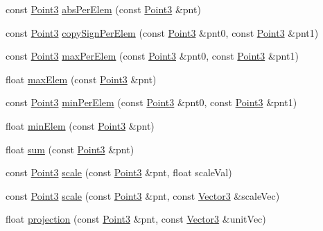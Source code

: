 \begin{DoxyCompactItemize}
\item 
const \hyperlink{classVectormath_1_1Aos_1_1Point3}{Point3} \hyperlink{namespaceVectormath_1_1Aos_a2dc9cb8fddee673606389e9eafd66e33}{abs\-Per\-Elem} (const \hyperlink{classVectormath_1_1Aos_1_1Point3}{Point3} \&pnt)
\item 
const \hyperlink{classVectormath_1_1Aos_1_1Point3}{Point3} \hyperlink{namespaceVectormath_1_1Aos_aa25654a3f5d357a4d5eec542447f8d8e}{copy\-Sign\-Per\-Elem} (const \hyperlink{classVectormath_1_1Aos_1_1Point3}{Point3} \&pnt0, const \hyperlink{classVectormath_1_1Aos_1_1Point3}{Point3} \&pnt1)
\item 
const \hyperlink{classVectormath_1_1Aos_1_1Point3}{Point3} \hyperlink{namespaceVectormath_1_1Aos_a9ca587f7de3b5a3c4bb8391a47576cc2}{max\-Per\-Elem} (const \hyperlink{classVectormath_1_1Aos_1_1Point3}{Point3} \&pnt0, const \hyperlink{classVectormath_1_1Aos_1_1Point3}{Point3} \&pnt1)
\item 
float \hyperlink{namespaceVectormath_1_1Aos_a5e9798fd4b969aa646e56d434034d2de}{max\-Elem} (const \hyperlink{classVectormath_1_1Aos_1_1Point3}{Point3} \&pnt)
\item 
const \hyperlink{classVectormath_1_1Aos_1_1Point3}{Point3} \hyperlink{namespaceVectormath_1_1Aos_a18164b2f0b6b300dc43e468582ccc79a}{min\-Per\-Elem} (const \hyperlink{classVectormath_1_1Aos_1_1Point3}{Point3} \&pnt0, const \hyperlink{classVectormath_1_1Aos_1_1Point3}{Point3} \&pnt1)
\item 
float \hyperlink{namespaceVectormath_1_1Aos_acefa5374909107ad74f2aff99df14588}{min\-Elem} (const \hyperlink{classVectormath_1_1Aos_1_1Point3}{Point3} \&pnt)
\item 
float \hyperlink{namespaceVectormath_1_1Aos_a57187186625f1230674d7dc0b632e03b}{sum} (const \hyperlink{classVectormath_1_1Aos_1_1Point3}{Point3} \&pnt)
\item 
const \hyperlink{classVectormath_1_1Aos_1_1Point3}{Point3} \hyperlink{namespaceVectormath_1_1Aos_a6410ede725d953578af2c271eba5b2b0}{scale} (const \hyperlink{classVectormath_1_1Aos_1_1Point3}{Point3} \&pnt, float scale\-Val)
\item 
const \hyperlink{classVectormath_1_1Aos_1_1Point3}{Point3} \hyperlink{namespaceVectormath_1_1Aos_a4ba8747d718822e3268430b6e06dcaf4}{scale} (const \hyperlink{classVectormath_1_1Aos_1_1Point3}{Point3} \&pnt, const \hyperlink{classVectormath_1_1Aos_1_1Vector3}{Vector3} \&scale\-Vec)
\item 
float \hyperlink{namespaceVectormath_1_1Aos_a936875ce20a59d623f0010b431581d98}{projection} (const \hyperlink{classVectormath_1_1Aos_1_1Point3}{Point3} \&pnt, const \hyperlink{classVectormath_1_1Aos_1_1Vector3}{Vector3} \&unit\-Vec)

\end{DoxyCompactItemize}
